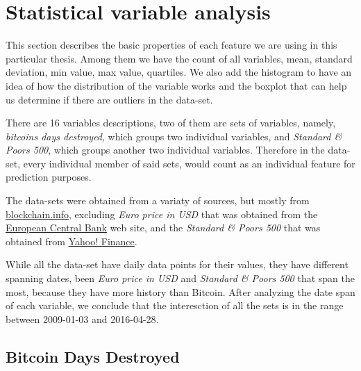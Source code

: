 



\chapter{Statistical variable analysis}
\label{ch:stat-var-analysis}

This section describes the basic properties of each feature we are
using in this particular thesis. Among them we have the count of all
variables, mean, standard deviation, min value, max value, quartiles.
We also add the histogram to have an idea of how the distribution of
the variable works and the boxplot that can help us determine if there
are outliers in the data-set.

There are 16 variables descriptions, two of them are sets of
variables, namely, \textit{bitcoins days destroyed}, which groups two
individual variables, and \textit{Standard \& Poors 500}, which groups
another two individual variables. Therefore in the data-set, every
individual member of said sets, would count as an individual feature
for prediction purposes.

The data-sets were obtained from a variaty of sources, but mostly from
\href{https://blockchain.info/charts}{blockchain.info}, excluding
\textit{Euro price in USD} that was obtained from the
\href{https://www.ecb.europa.eu/stats/exchange/eurofxref/html/index.en.html}{European
Central Bank} web site, and the \textit{Standard \& Poors 500} that
was obtained from
\href{https://finance.yahoo.com/q/hp?s=^GSPC\&a=00\&b=3\&c=1950\&d=05\&e=8\&f=2016\&g=d}{Yahoo!
Finance}.

While all the data-set have daily data points for their values, they
have different spanning dates, been \textit{Euro price in USD} and
\textit{Standard \& Poors 500} that span the most, because they have
more history than Bitcoin. After analyzing the date span of each
variable, we conclude that the interesction of all the sets is in the
range between 2009-01-03 and 2016-04-28.

\section{Bitcoin Days Destroyed}
\label{sec:bitcoin-days-destroyed}

